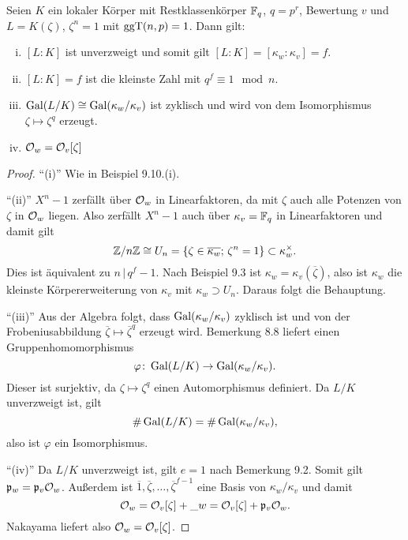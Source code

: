 \begin{Prop}
	Seien $K$ ein lokaler Körper mit Restklassenkörper $\mathbb{F}_q$, $q=p^r$, Bewertung $v$ und $L=K(\zeta)$, $\zeta^n =1$ mit $\operatorname{ggT}(n,p) = 1$. Dann gilt:
	\begin{enumerate}[(i)]
		\item $[L:K]$ ist unverzweigt und somit gilt $[L:K] = [\kappa_w:\kappa_v] =f$.
		\item $[L:K] = f$ ist die kleinste Zahl mit $q^f \equiv 1 \mod n$.
		\item $\operatorname{Gal}(L/K) \cong \operatorname{Gal}(\kappa_w/\kappa_v)$ ist zyklisch und wird von dem Isomorphismus $\zeta \mapsto \zeta^q$ erzeugt.
		\item $\mathcal{O}_w = \mathcal{O}_v[\zeta]$
	\end{enumerate}
\end{Prop}

\begin{proof}
	\enquote{(i)} Wie in Beispiel 9.10.(i).
	
	\bigskip \enquote{(ii)} $X^n-1$ zerfällt über $\mathcal{O}_w$ in Linearfaktoren, da mit $\zeta$ auch alle Potenzen von $\zeta$ in $\mathcal{O}_w$ liegen. Also zerfällt $X^n-1$ auch über $\kappa_v=\mathbb{F}_q$ in Linearfaktoren und damit gilt
	\[ \mathbb{Z} / n\mathbb{Z} \cong U_n = \left\{ 
	\zeta \in \overline{\kappa_w}; \, \zeta^n = 1
	\right\}
	\subset \kappa_w^\times.
	\]
	Dies ist äquivalent zu $n \, | \, q^f-1$. Nach Beispiel 9.3 ist $\kappa_w = \kappa_v(\overline{\zeta})$, also ist $\kappa_w$ die kleinste Körpererweiterung von $\kappa_v$ mit $\kappa_w \supset U_n$. Daraus folgt die Behauptung.
	
	\bigskip \enquote{(iii)} Aus der Algebra folgt, dass $\operatorname{Gal}(\kappa_w/\kappa_v)$ zyklisch ist und von der Frobeniusabbildung  $\overline{\zeta} \mapsto\overline{\zeta}^q$ erzeugt wird.
	Bemerkung 8.8 liefert einen Gruppenhomomorphismus
	\[ \varphi \colon \operatorname{Gal}(L/K) \to \operatorname{Gal}(\kappa_w/\kappa_v).
	\]
	Dieser ist surjektiv, da $\zeta\mapsto \zeta^q$ einen Automorphismus definiert.
	Da $L/K$ unverzweigt ist, gilt
	\[ \# \operatorname{Gal}(L/K) = \#\operatorname{Gal}(\kappa_w/\kappa_v),
	\]
	also ist $\varphi$ ein Isomorphismus.
	
	\bigskip \enquote{(iv)} Da $L/K$ unverzweigt ist, gilt $e=1$ nach Bemerkung 9.2. Somit gilt $\mathfrak{p}_w = \mathfrak{p}_v \mathcal{O}_w$.
	Außerdem ist $\overline{1}, \overline{\zeta}, \dots, \overline{\zeta}^{f-1}$ eine Basis von $\kappa_w / \kappa_v$ und damit
	\[ \mathcal{O}_w 
	= \mathcal{O}_v[\zeta] + \_w
	= \mathcal{O}_v[\zeta] + \mathfrak{p}_v\mathcal{O}_w.
	\]
	Nakayama liefert also $\mathcal{O}_w = \mathcal{O}_v[\zeta]$.
\end{proof}